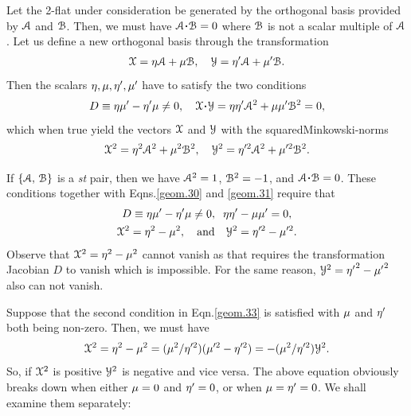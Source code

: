 Let the 2-flat under consideration be generated by the 
orthogonal basis provided by $\EuScript{A}$ and 
$\EuScript{B}$. Then, we must have 
$\EuScript{A}\dotp \EuScript{B}=0$ where 
$\EuScript{B}$ is 
not a scalar multiple of $\EuScript{A}$. Let us define 
a new orthogonal basis through the transformation 
\begin{align} \label{geom.30}
\EuScript{X}={\eta}\EuScript{A}+{\mu}\EuScript{
B},\quad\EuScript{Y}={\eta}'\EuScript{A}
+{\mu}'\EuScript{B}.
\end{align}
Then the scalars ${\eta},{\mu},{\eta}',{\mu}' $ have to 
satisfy 
the two conditions
\begin{align}  \label{geom.31}
D\equiv \gky\gkm'-\gky'\gkm\neq
0,\quad\EuScript{X}\dotp\EuScript{Y}
=\gky\gky'\EuScript{A}
^2+\gkm\gkm'\EuScript{B}^2=0,
\end{align}
which when true yield the vectors $\EuScript{X}$ and
$\EuScript{Y}$ with the  squared\lbk Minkowski-norms
\begin{align} \label{geom.32}
\EuScript{X}^2={\eta}^2\EuScript{A}
^2+{\mu}^2\EuScript{B}^2,\quad
\EuScript{Y}^2={\eta}'^2\EuScript{A}
^2+{\mu}'^2\EuScript{B}^2.
\end{align}

 If 
$\{\EuScript{A}, \,\EuScript{B}\}$ is a 
\textsl{st} pair, then we have $\EuScript{A}^2=1 $, 
$\EuScript{B}^2=-1$, and $\EuScript{A}\dotp 
\EuScript{B} 
=0$. These conditions together with 
Eqns.\eqref{geom.30} and
\eqref{geom.31} require that
\begin{gather} \label{geom.33}
D\equiv {\eta}{\mu}'-{\eta}'{\mu}\neq 0, \;\;
{\eta}{\eta}' - {\mu}{\mu}'= 0, \\\label{geom.34}
\EuScript{X} ^2={\eta}^2-{\mu}^2, \quad
\text{and} \quad  \EuScript{Y}
^2={\eta}'^2-{\mu}'^2.
\end{gather}
Observe that $\EuScript{X} ^2 ={\eta}^2-{\mu}^2$ cannot 
vanish as that requires  the transformation Jacobian 
$D$ to vanish which is impossible. For the same 
reason, 
 $\EuScript{Y} ^2 ={{\eta}'}^2-{{\mu}'}^2$ also can not 
vanish.


Suppose that the second condition in 
Eqn.\eqref{geom.33} is satisfied with  ${\mu}$ and 
${\eta}'$  both being non-zero. Then, we must have
\begin{align*}
\EuScript{X}^2 ={\eta}^2- {\mu}^2 =
({\mu}^2/{\eta}'^2) ({\mu}'^2-{\eta}'^2)= -
({\mu}^2/{\eta}'^2) \EuScript{Y}^2.
\end{align*}
So, if  $\EuScript{X}^2$ is positive $\EuScript{Y}^2$ 
is negative and vice versa. The above equation 
obviously breaks down when either ${\mu}=0$ and  
${\eta}'=0$, or  when ${\mu}={\eta}'=0$. We shall examine 
them separately:

